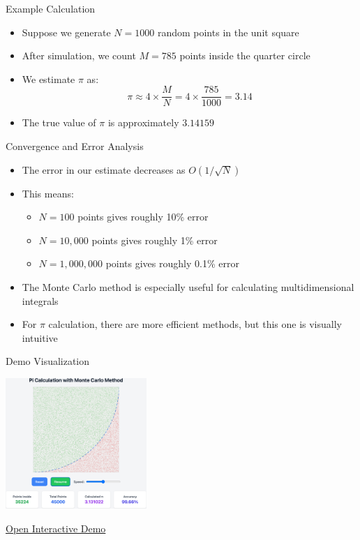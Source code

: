 \begin{frame}{Example Calculation}
  \begin{itemize}
    \item Suppose we generate $N = 1000$ random points in the unit square
    \item After simulation, we count $M = 785$ points inside the quarter circle
    \item We estimate $\pi$ as:
          \[ \pi \approx 4 \times \frac{M}{N} = 4 \times \frac{785}{1000} = 3.14 \]
    \item The true value of $\pi$ is approximately $3.14159$ \parencite{beckmann1971history}
  \end{itemize}
\end{frame}

\begin{frame}{Convergence and Error Analysis}
  \begin{itemize}
    \item The error in our estimate decreases as $O(1/\sqrt{N})$ \parencite{kalos2008monte}
    \item This means:
          \begin{itemize}
            \item $N=100$ points gives roughly 10\% error
            \item $N=10,000$ points gives roughly 1\% error
            \item $N=1,000,000$ points gives roughly 0.1\% error
          \end{itemize}
    \item The Monte Carlo method is especially useful for calculating multidimensional integrals \parencite{MonteCarloCookson2005}
    \item For $\pi$ calculation, there are more efficient methods, but this one is visually intuitive
  \end{itemize}
\end{frame}

\begin{frame}{Demo Visualization}
  \begin{center}
    \includegraphics[width=0.4\textwidth]{./programs/pi_calculation/pi_calculation.png}

    \vspace{0.5cm}
    \href{./programs/pi_calculation/pi_calculation.html}{Open Interactive Demo}
    \end{center}
\end{frame}
